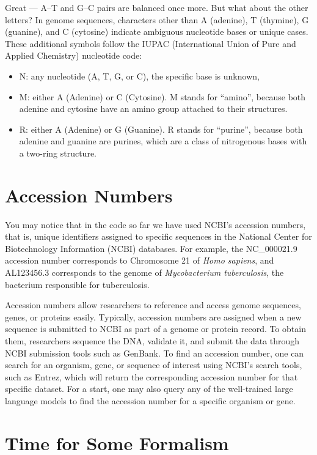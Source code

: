 Great — A–T and G–C pairs are balanced once more. But what about the other letters? In genome sequences, characters other than A (adenine), T (thymine), G (guanine), and C (cytosine) indicate ambiguous nucleotide bases or unique cases. These additional symbols follow the IUPAC (International Union of Pure and Applied Chemistry) nucleotide code:

\begin{itemize}
\item N: any nucleotide (A, T, G, or C), the specific base is unknown,
\item M: either A (Adenine) or C (Cytosine). M stands for ``amino'', because both adenine and cytosine have an amino group attached to their structures.
\item R: either A (Adenine) or G (Guanine). R stands for ``purine'', because both adenine and guanine are purines, which are a class of nitrogenous bases with a two-ring structure.
\end{itemize}

\section*{Accession Numbers}

You may notice that in the code so far we have used NCBI's accession numbers, that is, unique identifiers assigned to specific sequences in the National Center for Biotechnology Information (NCBI) databases. For example, the NC\_000021.9 accession number corresponds to Chromosome 21 of {\em Homo sapiens}, and AL123456.3 corresponds to the genome of {\em Mycobacterium tuberculosis}, the bacterium responsible for tuberculosis.

Accession numbers allow researchers to reference and access genome sequences, genes, or proteins easily. Typically, accession numbers are assigned when a new sequence is submitted to NCBI as part of a genome or protein record. To obtain them, researchers sequence the DNA, validate it, and submit the data through NCBI submission tools such as GenBank. To find an accession number, one can search for an organism, gene, or sequence of interest using NCBI’s search tools, such as Entrez, which will return the corresponding accession number for that specific dataset. For a start, one may also query any of the well-trained large language models to find the accession number for a specific organism or gene.

\section*{Time for Some Formalism}

